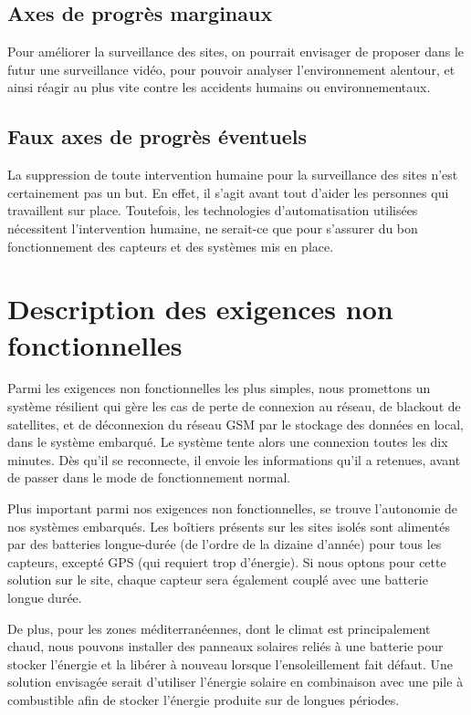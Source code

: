 \subsection{Axes de progrès marginaux}

Pour améliorer la surveillance des sites, on pourrait envisager de proposer dans le futur une surveillance vidéo, pour pouvoir analyser l’environnement alentour, et ainsi réagir au plus vite contre les accidents humains ou environnementaux.

\subsection{Faux axes de progrès éventuels}

La suppression de toute intervention humaine pour la surveillance des sites n’est certainement pas un but. En effet, il s’agit avant tout d’aider les personnes qui travaillent sur place. Toutefois, les technologies d’automatisation utilisées nécessitent l’intervention humaine, ne serait-ce que pour s’assurer du bon fonctionnement des capteurs et des systèmes mis en place.

\section{Description des exigences non fonctionnelles}

Parmi les exigences non fonctionnelles les plus simples, nous promettons un système résilient qui gère les cas de perte de connexion au réseau, de blackout de satellites, et de déconnexion du réseau GSM par le stockage des données en local, dans le système embarqué. Le système tente alors une connexion toutes les dix minutes. Dès qu’il se reconnecte, il envoie les informations qu’il a retenues, avant de passer dans le mode de fonctionnement normal.

Plus important parmi nos exigences non fonctionnelles, se trouve l’autonomie de nos systèmes embarqués. Les boîtiers présents sur les sites isolés sont alimentés par des batteries longue-durée (de l’ordre de la dizaine d’année) pour tous les capteurs, excepté GPS (qui requiert trop d’énergie). Si nous optons pour cette solution sur le site, chaque capteur sera également couplé avec une batterie longue durée.

De plus, pour les zones méditerranéennes, dont le climat est principalement chaud, nous pouvons installer des panneaux solaires reliés à une batterie pour stocker l’énergie et la libérer à nouveau lorsque l'ensoleillement fait défaut. Une solution envisagée serait d’utiliser l’énergie solaire en combinaison avec une pile à combustible afin de stocker l’énergie produite sur de longues périodes.


